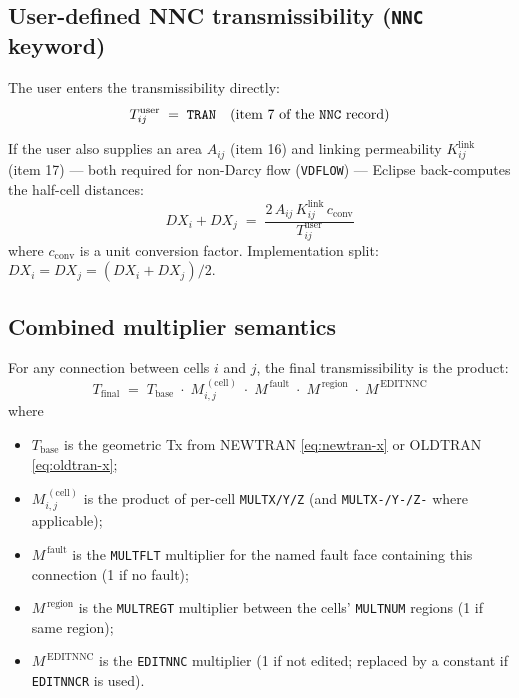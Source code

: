 \documentclass[11pt,a4paper]{article}
\newcommand{\kw}[1]{\texttt{#1}}
\begin{document}
\subsection*{User-defined NNC transmissibility (\kw{NNC} keyword)}
The user enters the transmissibility directly:
\begin{equation}
T_{ij}^{\text{user}} \;=\; \kw{TRAN} \quad \text{(item 7 of the \kw{NNC} record)}
\label{eq:nnc-user}
\end{equation}

If the user also supplies an area $A_{ij}$ (item 16) and linking permeability $K^{\text{link}}_{ij}$
(item 17) — both required for non-Darcy flow (\kw{VDFLOW}) — Eclipse back-computes the half-cell distances:
\begin{equation}
DX_i + DX_j \;=\; \frac{2\,A_{ij}\,K^{\text{link}}_{ij}\,c_{\text{conv}}}{T_{ij}^{\text{user}}}
\label{eq:nnc-backcompute}
\end{equation}
where $c_{\text{conv}}$ is a unit conversion factor. Implementation split: \(DX_i = DX_j = (DX_i + DX_j)/2\).

\subsection*{Combined multiplier semantics}
For any connection between cells $i$ and $j$, the final transmissibility is the product:
\begin{equation}
T_{\text{final}}\;=\; T_{\text{base}} \;\cdot\; M_{i,j}^{\,(\text{cell})} \;\cdot\; M^{\,\text{fault}} \;\cdot\; M^{\,\text{region}} \;\cdot\; M^{\,\text{EDITNNC}}
\label{eq:Tfinal}
\end{equation}
where
\begin{itemize}
  \item $T_{\text{base}}$ is the geometric Tx from NEWTRAN \eqref{eq:newtran-x} or OLDTRAN \eqref{eq:oldtran-x};
  \item $M_{i,j}^{\,(\text{cell})}$ is the product of per-cell \kw{MULTX/Y/Z} (and \kw{MULTX-/Y-/Z-} where applicable);
  \item $M^{\,\text{fault}}$ is the \kw{MULTFLT} multiplier for the named fault face containing this connection (1 if no fault);
  \item $M^{\,\text{region}}$ is the \kw{MULTREGT} multiplier between the cells' \kw{MULTNUM} regions (1 if same region);
  \item $M^{\,\text{EDITNNC}}$ is the \kw{EDITNNC} multiplier (1 if not edited; replaced by a constant if \kw{EDITNNCR} is used).
\end{itemize}
\end{document}
